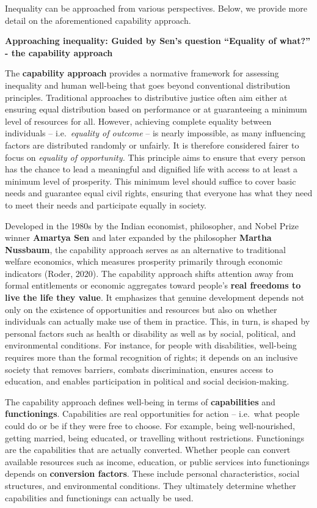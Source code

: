 \documentclass[
  a4paper,
  openany]{book}
\begin{document}
Inequality can be approached from various perspectives. Below, we
provide more detail on the aforementioned capability approach.

\textbf{Approaching inequality: Guided by Sen's question ``Equality of
what?'' - the capability approach}

The \textbf{capability approach} provides a normative framework for
assessing inequality and human well-being that goes beyond conventional
distribution principles. Traditional approaches to distributive justice
often aim either at ensuring equal distribution based on performance or
at guaranteeing a minimum level of resources for all. However, achieving
complete equality between individuals -- i.e.~\emph{equality of outcome}
-- is nearly impossible, as many influencing factors are distributed
randomly or unfairly. It is therefore considered fairer to focus on
\emph{equality of opportunity.} This principle aims to ensure that every
person has the chance to lead a meaningful and dignified life with
access to at least a minimum level of prosperity. This minimum level
should suffice to cover basic needs and guarantee equal civil rights,
ensuring that everyone has what they need to meet their needs and
participate equally in society.

Developed in the 1980s by the Indian economist, philosopher, and Nobel
Prize winner \textbf{Amartya Sen} and later expanded by the philosopher
\textbf{Martha Nussbaum}, the capability approach serves as an
alternative to traditional welfare economics, which measures prosperity
primarily through economic indicators (Roder, 2020). The capability
approach shifts attention away from formal entitlements or economic
aggregates toward people's \textbf{real freedoms to live the life they
value}. It emphasizes that genuine development depends not only on the
existence of opportunities and resources but also on whether individuals
can actually make use of them in practice. This, in turn, is shaped by
personal factors such as health or disability as well as by social,
political, and environmental conditions. For instance, for people with
disabilities, well-being requires more than the formal recognition of
rights; it depends on an inclusive society that removes barriers,
combats discrimination, ensures access to education, and enables
participation in political and social decision-making.

The capability approach defines well-being in terms of
\textbf{capabilities} and \textbf{functionings}. Capabilities are real
opportunities for action -- i.e.~what people could do or be if they were
free to choose. For example, being well-nourished, getting married,
being educated, or travelling without restrictions. Functionings are the
capabilities that are actually converted. Whether people can convert
available resources such as income, education, or public services into
functionings depends on \textbf{conversion factors}. These include
personal characteristics, social structures, and environmental
conditions. They ultimately determine whether capabilities and
functionings can actually be used.
\end{document}
